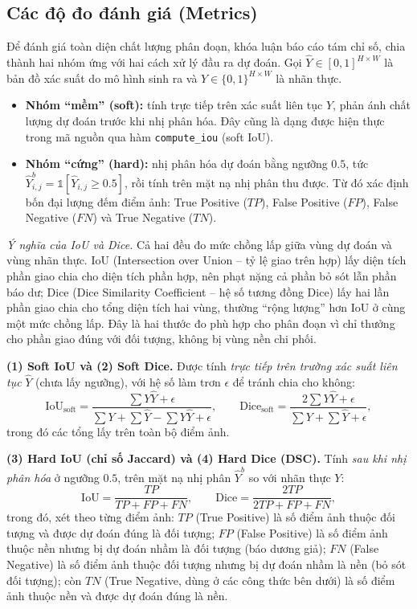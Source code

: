 \subsection{Các độ đo đánh giá (Metrics)}
\label{subsec:metrics}
Để đánh giá toàn diện chất lượng phân đoạn, khóa luận báo cáo tám chỉ số, chia thành hai nhóm ứng với hai cách xử lý đầu ra dự đoán. Gọi $\hat{Y} \in [0,1]^{H\times W}$ là bản đồ xác suất do mô hình sinh ra và $Y \in \{0,1\}^{H\times W}$ là nhãn thực.
\begin{itemize}
    \item \textbf{Nhóm ``mềm'' (soft):} tính trực tiếp trên xác suất liên tục $\hat{Y}$, phản ánh chất lượng dự đoán trước khi nhị phân hóa. Đây cũng là dạng được hiện thực trong mã nguồn qua hàm \texttt{compute\_iou} (soft IoU).
    \item \textbf{Nhóm ``cứng'' (hard):} nhị phân hóa dự đoán bằng ngưỡng $0.5$, tức $\hat{Y}^{b}_{i,j} = \mathbb{1}[\hat{Y}_{i,j} \ge 0.5]$, rồi tính trên mặt nạ nhị phân thu được. Từ đó xác định bốn đại lượng đếm điểm ảnh: True Positive ($TP$), False Positive ($FP$), False Negative ($FN$) và True Negative ($TN$).
\end{itemize}

\emph{Ý nghĩa của IoU và Dice.} Cả hai đều đo mức chồng lấp giữa vùng dự đoán và vùng nhãn thực. IoU (Intersection over Union -- tỷ lệ giao trên hợp) lấy diện tích phần giao chia cho diện tích phần hợp, nên phạt nặng cả phần bỏ sót lẫn phần báo dư; Dice (Dice Similarity Coefficient -- hệ số tương đồng Dice) lấy hai lần phần giao chia cho tổng diện tích hai vùng, thường ``rộng lượng'' hơn IoU ở cùng một mức chồng lấp. Đây là hai thước đo phù hợp cho phân đoạn vì chỉ thưởng cho phần giao đúng với đối tượng, không bị vùng nền chi phối.

\noindent\textbf{(1) Soft IoU và (2) Soft Dice.} Được tính \emph{trực tiếp trên trường xác suất liên tục} $\hat{Y}$ (chưa lấy ngưỡng), với hệ số làm trơn $\epsilon$ để tránh chia cho không:
\begin{equation}
    \text{IoU}_{\text{soft}} = \frac{\sum Y\hat{Y} + \epsilon}{\sum Y + \sum \hat{Y} - \sum Y\hat{Y} + \epsilon},
    \qquad
    \text{Dice}_{\text{soft}} = \frac{2\sum Y\hat{Y} + \epsilon}{\sum Y + \sum \hat{Y} + \epsilon},
\end{equation}
trong đó các tổng lấy trên toàn bộ điểm ảnh.

\noindent\textbf{(3) Hard IoU (chỉ số Jaccard) và (4) Hard Dice (DSC).} Tính \emph{sau khi nhị phân hóa} ở ngưỡng $0.5$, trên mặt nạ nhị phân $\hat{Y}^b$ so với nhãn thực $Y$:
\begin{equation}
    \text{IoU} = \frac{TP}{TP + FP + FN},
    \qquad
    \text{Dice} = \frac{2TP}{2TP + FP + FN},
\end{equation}
trong đó, xét theo từng điểm ảnh: $TP$ (True Positive) là số điểm ảnh thuộc đối tượng và được dự đoán đúng là đối tượng; $FP$ (False Positive) là số điểm ảnh thuộc nền nhưng bị dự đoán nhầm là đối tượng (báo dương giả); $FN$ (False Negative) là số điểm ảnh thuộc đối tượng nhưng bị dự đoán nhầm là nền (bỏ sót đối tượng); còn $TN$ (True Negative, dùng ở các công thức bên dưới) là số điểm ảnh thuộc nền và được dự đoán đúng là nền.

